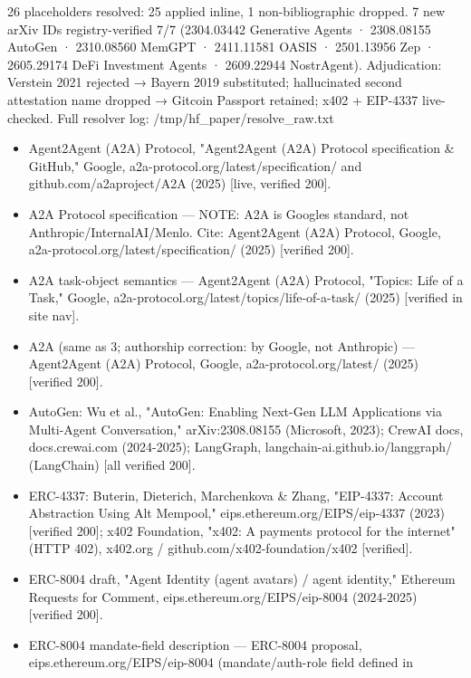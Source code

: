 \documentclass[
]{article}
\providecommand{\tightlist}{%
  \setlength{\itemsep}{0pt}\setlength{\parskip}{0pt}}
\begin{document}
26 placeholders resolved: 25 applied inline, 1 non-bibliographic
dropped. 7 new arXiv IDs registry-verified 7/7 (2304.03442 Generative
Agents · 2308.08155 AutoGen · 2310.08560 MemGPT · 2411.11581 OASIS ·
2501.13956 Zep · 2605.29174 DeFi Investment Agents · 2609.22944
NostrAgent). Adjudication: \textquotesingle Verstein
2021\textquotesingle{} rejected → Bayern 2019 substituted; hallucinated
second attestation name dropped → Gitcoin Passport retained; x402 +
EIP-4337 live-checked. Full resolver log:
/tmp/hf\_paper/resolve\_raw.txt

\begin{itemize}
\tightlist
\item
  Agent2Agent (A2A) Protocol, "Agent2Agent (A2A) Protocol specification
  \& GitHub," Google, a2a-protocol.org/latest/specification/ and
  github.com/a2aproject/A2A (2025) {[}live, verified 200{]}.
\item
  A2A Protocol specification --- NOTE: A2A is Google\textquotesingle s
  standard, not Anthropic/InternalAI/Menlo. Cite: Agent2Agent (A2A)
  Protocol, Google, a2a-protocol.org/latest/specification/ (2025)
  {[}verified 200{]}.
\item
  A2A task-object semantics --- Agent2Agent (A2A) Protocol, "Topics:
  Life of a Task," Google,
  a2a-protocol.org/latest/topics/life-of-a-task/ (2025) {[}verified in
  site nav{]}.
\item
  A2A (same as 3; authorship correction: by Google, not Anthropic) ---
  Agent2Agent (A2A) Protocol, Google, a2a-protocol.org/latest/ (2025)
  {[}verified 200{]}.
\item
  AutoGen: Wu et al., "AutoGen: Enabling Next-Gen LLM Applications via
  Multi-Agent Conversation," arXiv:2308.08155 (Microsoft, 2023); CrewAI
  docs, docs.crewai.com (2024-2025); LangGraph,
  langchain-ai.github.io/langgraph/ (LangChain) {[}all verified 200{]}.
\item
  ERC-4337: Buterin, Dieterich, Marchenkova \& Zhang, "EIP-4337: Account
  Abstraction Using Alt Mempool," eips.ethereum.org/EIPS/eip-4337 (2023)
  {[}verified 200{]}; x402 Foundation, "x402: A payments protocol for
  the internet" (HTTP 402), x402.org / github.com/x402-foundation/x402
  {[}verified{]}.
\item
  ERC-8004 draft, "Agent Identity (agent avatars) / agent identity,"
  Ethereum Requests for Comment, eips.ethereum.org/EIPS/eip-8004
  (2024-2025) {[}verified 200{]}.
\item
  ERC-8004 mandate-field description --- ERC-8004 proposal,
  eips.ethereum.org/EIPS/eip-8004 (mandate/auth-role field defined in

\end{itemize}
\end{document}
